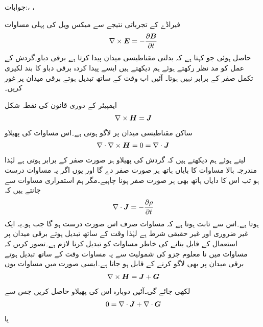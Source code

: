 جوابات:، ، 


فیراڈے کے تجرباتی نتیجے سے میکس ویل کی پہلی مساوات
\begin{align}\label{مساوات_میکس_ویل_انتقالی_رو_الف}
\nabla \times {\ensuremath{{\boldsymbol{E}}}}=-\frac{\partial {\ensuremath{{\boldsymbol{B}}}}}{\partial t}
\end{align}
حاصل ہوئی جو کہتا ہے کہ بدلتی مقناطیسی میدان پیدا کرتا ہے برقی دباو۔گردش کے عمل کو مد نظر رکھتے ہوئے ہم دیکھتے ہیں ایسے پیدا کردہ برقی دباو کا بند لکیری تکمل صفر کے برابر نہیں ہوتا۔ آئیں اب وقت کے ساتھ تبدیل ہوتے برقی میدان پر غور کریں۔

ایمپیئر کے دوری قانون کی نقطہ شکل
\begin{align}\label{مساوات_میکس_ویل_ایمپیئر_دوری_نقطہ_صورت}
\nabla \times {\ensuremath{{\boldsymbol{H}}}}={{\boldsymbol{J}}}
\end{align}
ساکن مقناطیسی میدان پر لاگو ہوتی ہے۔اس مساوات کی پھیلاو
\begin{align*}
\nabla \cdot \nabla \times {\ensuremath{{\boldsymbol{H}}}}=0=\nabla \cdot {\ensuremath{{\boldsymbol{J}}}}
\end{align*}
 لیتے ہوئے ہم دیکھتے ہیں کہ گردش کی پھیلاو ہر صورت صفر کے برابر ہوتی ہے لہٰذا مندرجہ بالا مساوات کا بایاں ہاتھ ہر صورت صفر دے گا اور یوں اگر یہ مساوات درست ہو تب اس کا دایاں ہاتھ بھی ہر صورت صفر ہونا چاہیے۔مگر ہم استمراری  مساوات سے جانتے ہیں کہ
\begin{align}
\nabla \cdot {\ensuremath{{\boldsymbol{J}}}}=-\frac{\partial \rho}{\partial t}
\end{align} 
ہوتا ہے۔اس سے ثابت ہوتا ہے کہ مساوات  صرف اس صورت درست ہو گا جب  ہو۔یہ ایک غیر ضروری اور غیر حقیقی شرط ہے لہٰذا وقت کے ساتھ تبدیل ہوتے برقی میدان پر استعمال کے قابل بنانے کی خاطر  مساوات  کو تبدیل کرنا لازم ہے۔تصور کریں کہ مساوات  میں نا معلوم جزو  کی شمولیت سے یہ مساوات وقت  کے ساتھ تبدیل ہوتے برقی میدان پر بھی لاگو کرنے کے قابل ہو جاتا ہے۔ایسی صورت میں مساوات  یوں
\begin{align*}
\nabla \times {\ensuremath{{\boldsymbol{H}}}}={{\boldsymbol{J}}}+{{\boldsymbol{G}}}
\end{align*}
لکھی جائے گی۔آئیں دوبارہ اس کی پھیلاو حاصل کریں جس سے
\begin{align*}
0=\nabla \cdot {\ensuremath{{\boldsymbol{J}}}}+\nabla \cdot {\ensuremath{{\boldsymbol{G}}}}
\end{align*}
یا
